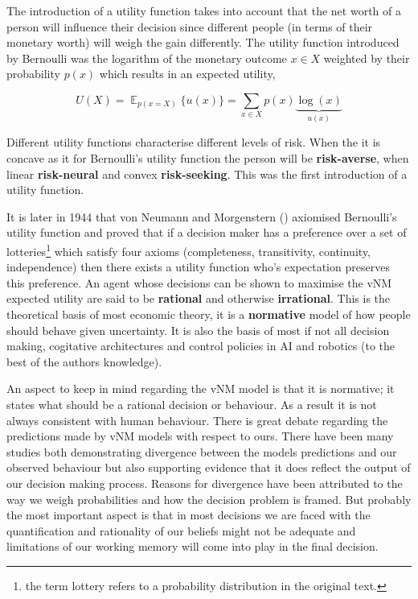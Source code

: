 The introduction of a utility function takes into account that the net worth of a person will influence their decision since 
different people (in terms of their monetary worth) will weigh the gain differently. The utility function introduced by Bernoulli 
was the logarithm of the monetary outcome $x \in X$ weighted by their probability $p(x)$ which results in an expected utility, 

\begin{equation*}\label{eq:exp_utility}
  U(X) = \displaystyle \mathop{\mathbb{E}}_{p(x=X)} \{ u(x) \} = \sum_{x\in X} p(x) \underbrace{\log(x)}_{u(x)}
\end{equation*}

Different utility functions characterise different levels of risk. When the it is concave as it for Bernoulli's utility function
the person will be \textbf{risk-averse}, when linear \textbf{risk-neural} and convex \textbf{risk-seeking}. 
This was the first introduction of a utility function.

It is later in 1944 that von Neumann and Morgenstern (\cite{VonNeumann1944}) axiomised Bernoulli's utility function 
and proved that if a decision maker has a preference over a set of lotteries\footnote{the term lottery refers 
to a probability distribution in the original text.} which satisfy four axioms
(completeness, transitivity, continuity, independence) then there exists a utility function who's expectation 
preserves this preference. An agent whose decisions can be shown to maximise the vNM expected utility are said 
to be \textbf{rational} and otherwise \textbf{irrational}.  This is the theoretical basis of most economic theory,
it is a \textbf{normative} model of how people should behave given uncertainty. It is also the basis of most 
if not all decision making, cogitative architectures and control policies in AI and robotics 
(to the best of the authors knowledge).

An aspect to keep in mind regarding the vNM model is that it is normative; it states what should be a rational decision 
or behaviour. As a result it is not always consistent with human behaviour. There is great debate regarding 
the predictions made by vNM models with respect to ours. There have been many studies both demonstrating divergence 
between the models predictions and our observed behaviour but also supporting evidence that it does reflect 
the output of our decision making process. Reasons for divergence have been attributed to the way we 
weigh probabilities and how the decision problem is framed. But probably the most important aspect is that 
in most decisions we are faced with the quantification and rationality of our beliefs might not be adequate
and limitations of our working memory will come into play in the final decision.

